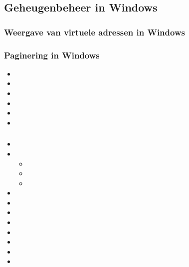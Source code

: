 \subsection{Geheugenbeheer in Windows}

\subsubsection{Weergave van virtuele adressen in Windows}

\subsubsection{Paginering in Windows}

\begin{itemize}
\item 
\item 
\item 
\item 
\item 
\item 
\end{itemize}

\subsubsection{}

\begin{itemize}
    \item 
    \item 
        \begin{itemize}
        \item 
        \item 
        \item 
        \end{itemize}
    \item 
    \item 
    \item 
    \item 
    \item 
    \item 
    \item 
    \item 
\end{itemize}


\subsubsection{}

\subsubsection{}

\subsubsection{}

\subsubsection{}

\subsubsubsection{}

\subsubsubsection{}

\subsubsubsection{}

\subsubsubsection{}

\subsubsubsection{}

\subsubsubsection{}